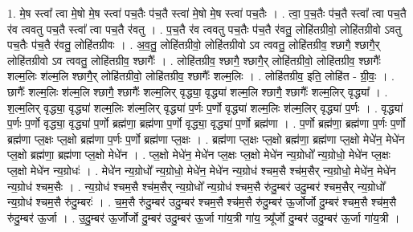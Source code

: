 \documentclass[17pt]{extarticle}
\begin{document}
1. मे॒ष स्त्वा᳚ त्वा मे॒षो मे॒ष स्त्वा॑ पच॒तैः प॑च॒तै स्त्वा॑ मे॒षो मे॒ष स्त्वा॑ पच॒तैः । . त्वा॒ प॒च॒तैः प॑च॒तै स्त्वा᳚ त्वा पच॒तै र॑व त्ववतु पच॒तै स्त्वा᳚ त्वा पच॒तै र॑वतु । . प॒च॒तै र॑व त्ववतु पच॒तैः प॑च॒तै र॑वतु॒ लोहि॑तग्रीवो॒ लोहि॑तग्रीवो ऽवतु पच॒तैः प॑च॒तै र॑वतु॒ लोहि॑तग्रीवः । . अ॒व॒तु॒ लोहि॑तग्रीवो॒ लोहि॑तग्रीवो ऽव त्ववतु॒ लोहि॑तग्रीव॒ श्छागै॒ श्छागै॒र् लोहि॑तग्रीवो ऽव त्ववतु॒ लोहि॑तग्रीव॒ श्छागैः᳚ । . लोहि॑तग्रीव॒ श्छागै॒ श्छागै॒र् लोहि॑तग्रीवो॒ लोहि॑तग्रीव॒ श्छागैः᳚ शल्म॒लिः श॑ल्म॒लि श्छागै॒र् लोहि॑तग्रीवो॒ लोहि॑तग्रीव॒ श्छागैः᳚ शल्म॒लिः । . लोहि॑तग्रीव॒ इति॒ लोहि॑त - ग्री॒वः॒ । . छागैः᳚ शल्म॒लिः श॑ल्म॒लि श्छागै॒ श्छागैः᳚ शल्म॒लिर् वृद्ध्या॒ वृद्ध्या॑ शल्म॒लि श्छागै॒ श्छागैः᳚ शल्म॒लिर् वृद्ध्या᳚ । . श॒ल्म॒लिर् वृद्ध्या॒ वृद्ध्या॑ शल्म॒लिः श॑ल्म॒लिर् वृद्ध्या॑ प॒र्णः प॒र्णो वृद्ध्या॑ शल्म॒लिः श॑ल्म॒लिर् वृद्ध्या॑ प॒र्णः । . वृद्ध्या॑ प॒र्णः प॒र्णो वृद्ध्या॒ वृद्ध्या॑ प॒र्णो ब्रह्म॑णा॒ ब्रह्म॑णा प॒र्णो वृद्ध्या॒ वृद्ध्या॑ प॒र्णो ब्रह्म॑णा । . प॒र्णो ब्रह्म॑णा॒ ब्रह्म॑णा प॒र्णः प॒र्णो ब्रह्म॑णा प्ल॒क्षः प्ल॒क्षो ब्रह्म॑णा प॒र्णः प॒र्णो ब्रह्म॑णा प्ल॒क्षः । . ब्रह्म॑णा प्ल॒क्षः प्ल॒क्षो ब्रह्म॑णा॒ ब्रह्म॑णा प्ल॒क्षो मेधे॑न॒ मेधे॑न प्ल॒क्षो ब्रह्म॑णा॒ ब्रह्म॑णा प्ल॒क्षो मेधे॑न । . प्ल॒क्षो मेधे॑न॒ मेधे॑न प्ल॒क्षः प्ल॒क्षो मेधे॑न न्य॒ग्रोधो᳚ न्य॒ग्रोधो॒ मेधे॑न प्ल॒क्षः प्ल॒क्षो मेधे॑न न्य॒ग्रोधः॑ । . मेधे॑न न्य॒ग्रोधो᳚ न्य॒ग्रोधो॒ मेधे॑न॒ मेधे॑न न्य॒ग्रोध॑ श्चम॒सै श्च॑म॒सैर् न्य॒ग्रोधो॒ मेधे॑न॒ मेधे॑न न्य॒ग्रोध॑ श्चम॒सैः । . न्य॒ग्रोध॑ श्चम॒सै श्च॑म॒सैर् न्य॒ग्रोधो᳚ न्य॒ग्रोध॑ श्चम॒सै रु॑दु॒म्बर॑ उदु॒म्बर॑ श्चम॒सैर् न्य॒ग्रोधो᳚ न्य॒ग्रोध॑ श्चम॒सै रु॑दु॒म्बरः॑ । . च॒म॒सै रु॑दु॒म्बर॑ उदु॒म्बर॑ श्चम॒सै श्च॑म॒सै रु॑दु॒म्बर॑ ऊ॒र्जोर्जो दु॒म्बर॑ श्चम॒सै श्च॑म॒सै रु॑दु॒म्बर॑ ऊ॒र्जा । . उ॒दु॒म्बर॑ ऊ॒र्जोर्जो दु॒म्बर॑ उदु॒म्बर॑ ऊ॒र्जा गा॑य॒त्री गा॑य॒ त्र्यू᳚र्जो दु॒म्बर॑ उदु॒म्बर॑ ऊ॒र्जा गा॑य॒त्री । \newline
\end{document}
